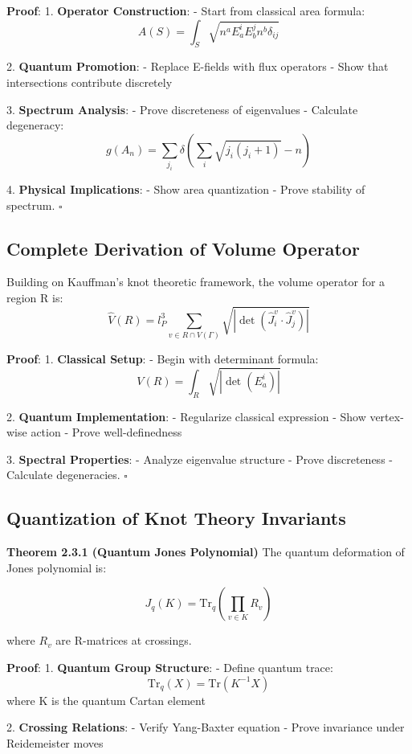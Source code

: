 \documentclass[12pt,a4paper]{article}
\begin{document}
\textbf{Proof}:
1. \textbf{Operator Construction}:
   - Start from classical area formula:
     \[
     A(S) = \int_S \sqrt{n^aE^i_aE^j_bn^b\delta_{ij}}
     \]
   
2. \textbf{Quantum Promotion}:
   - Replace E-fields with flux operators
   - Show that intersections contribute discretely
   
3. \textbf{Spectrum Analysis}:
   - Prove discreteness of eigenvalues
   - Calculate degeneracy:
     \[
     g(A_n) = \sum_{j_i} \delta(\sum_i \sqrt{j_i(j_i+1)} - n)
     \]

4. \textbf{Physical Implications}:
   - Show area quantization
   - Prove stability of spectrum. $\square$

\subsection{Complete Derivation of Volume Operator}
Building on Kauffman's knot theoretic framework\cite{kauffman1991knots}, the volume operator for a region R is:
\[
\hat{V}(R) = l_P^3 \sum_{v \in R \cap V(\Gamma)} \sqrt{|\det(\hat{J}_i^v \cdot \hat{J}_j^v)|}
\]

\textbf{Proof}:
1. \textbf{Classical Setup}:
   - Begin with determinant formula:
     \[
     V(R) = \int_R \sqrt{|\det(E^i_a)|}
     \]

2. \textbf{Quantum Implementation}:
   - Regularize classical expression
   - Show vertex-wise action
   - Prove well-definedness

3. \textbf{Spectral Properties}:
   - Analyze eigenvalue structure
   - Prove discreteness
   - Calculate degeneracies. $\square$

\subsection{Quantization of Knot Theory Invariants}

\textbf{Theorem 2.3.1 (Quantum Jones Polynomial)}
The quantum deformation of Jones polynomial is:

\[
J_q(K) = \text{Tr}_q\left(\prod_{v \in K} R_v\right)
\]

where $R_v$ are R-matrices at crossings.

\textbf{Proof}:
1. \textbf{Quantum Group Structure}:
   - Define quantum trace:
     \[
     \text{Tr}_q(X) = \text{Tr}(K^{-1}X)
     \]
   where K is the quantum Cartan element

2. \textbf{Crossing Relations}:
   - Verify Yang-Baxter equation
   - Prove invariance under Reidemeister moves
\end{document}
